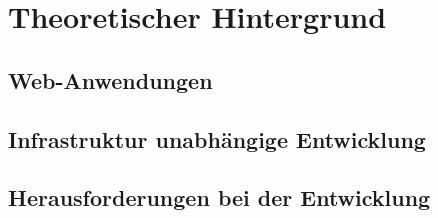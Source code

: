 \chapter{Theoretischer Hintergrund}

\section{Web-Anwendungen}
\label{sec:visual_analytics}

\section{Infrastruktur unabhängige Entwicklung}

\section{Herausforderungen bei der Entwicklung}

\cite{Sammon.1969}\\
\cite{Demartines.1997}\\